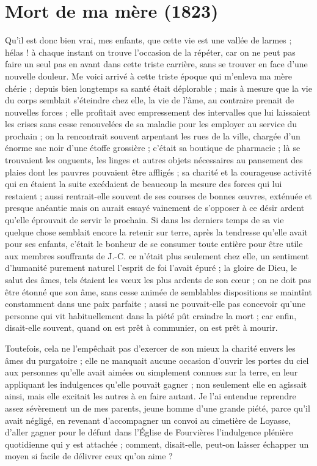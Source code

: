 \documentclass[11pt,a4paper]{report}
\begin{document}
\section*{Mort de ma mère (1823)}

Qu'il est donc bien vrai, mes enfants, que cette vie est une vallée de larmes ; hélas ! à chaque instant on trouve l'occasion de la répéter, car on ne peut pas faire un seul pas en avant dans cette triste carrière, sans se trouver en face d'une nouvelle douleur. Me voici arrivé à cette triste époque qui m'enleva ma mère chérie ; depuis bien longtemps sa santé était déplorable ; mais à mesure que la vie du corps semblait s'éteindre chez elle, la vie de l'âme, au contraire prenait de nouvelles forces ; elle profitait avec empressement des intervalles que lui laissaient les crises sans cesse renouvelées de sa maladie pour les employer au service du prochain ; on la rencontrait souvent arpentant les rues de la ville, chargée d'un énorme sac noir d'une étoffe grossière ; c'était sa boutique de pharmacie ; là se trouvaient les onguents, les linges et autres objets nécessaires au pansement des plaies dont les pauvres pouvaient être affligés ; sa charité et la courageuse activité qui en étaient la suite excédaient de beaucoup la mesure des forces qui lui restaient ; aussi rentrait-elle souvent de ses courses de bonnes œuvres, exténuée et presque anéantie mais on aurait essayé vainement de s'opposer à ce désir ardent qu'elle éprouvait de servir le prochain. Si dans les derniers temps de sa vie quelque chose semblait encore la retenir sur terre, après la tendresse qu'elle avait pour ses enfants, c'était le bonheur de se consumer toute entière pour être utile aux membres souffrants de J.-C. ce n'était plus seulement chez elle, un sentiment d'humanité purement naturel l'esprit de foi l'avait épuré ; la gloire de Dieu, le salut des âmes, tels étaient les vœux les plus ardents de son cœur ; on ne doit pas être étonné que son âme, sans cesse animée de semblables dispositions se maintînt constamment dans une paix parfaite ; aussi ne pouvait-elle pas concevoir qu'une personne qui vit habituellement dans la piété pût craindre la mort ; car enfin, disait-elle souvent, quand on est prêt à communier, on est prêt à mourir.

Toutefois, cela ne l'empêchait pas d'exercer de son mieux la charité envers les âmes du purgatoire ; elle ne manquait aucune occasion d'ouvrir les portes du ciel aux personnes qu'elle avait aimées ou simplement connues sur la terre, en leur appliquant les indulgences qu'elle pouvait gagner ; non seulement elle en agissait ainsi, mais elle excitait les autres à en faire autant. Je l'ai entendue reprendre assez sévèrement un de mes parents, jeune homme d'une grande piété, parce qu'il avait négligé, en revenant d'accompagner un convoi au cimetière de Loyasse, d'aller gagner pour le défunt dans l'Église de Fourvières l'indulgence plénière quotidienne qui y est attachée ; comment, disait-elle, peut-on laisser échapper un moyen si facile de délivrer ceux qu'on aime ?
\end{document}
